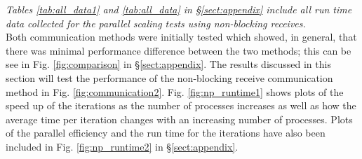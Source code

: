 \documentclass[11pt, a4paper]{article}
\begin{document}
			\textit{Tables \ref{tab:all_data1} and \ref{tab:all_data} in \S\ref{sect:appendix} include all run time data collected for the parallel scaling tests using non-blocking receives.}\\
			
			\noindent Both communication methods were initially tested which showed, in general, that there was minimal performance difference between the two methods; this can be see in Fig. \ref{fig:comparison} in \S\ref{sect:appendix}. The results discussed in this section will test the performance of the non-blocking receive communication method in Fig. \ref{fig:communication2}. Fig. \ref{fig:np_runtime1} shows plots of the speed up of the iterations as the number of processes increases as well as how the average time per iteration changes with an increasing number of processes. Plots of the parallel efficiency and the run time for the iterations have also been included in Fig. \ref{fig:np_runtime2} in \S\ref{sect:appendix}.
			
\end{document}
